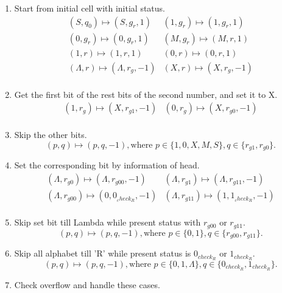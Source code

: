 \documentclass[a4papper]{article}
\theoremstyle{neosn}
\begin{document}
    \begin{enumerate}
        \item Start from initial cell with initial status.
        \[
            \begin{array}{ll}
            (S, q_{0}) \mapsto (S, g_{r}, 1) & (1, g_{r}) \mapsto (1, g_{r}, 1) \\
            (0, g_{r}) \mapsto (0, g_{r}, 1) & (M, g_{r}) \mapsto (M, r, 1) \\
            (1, r) \mapsto (1, r, 1) & (0, r) \mapsto (0, r, 1) \\
            (\Lambda, r) \mapsto (\Lambda, r_{g}, -1) & (X, r) \mapsto (X, r_{g}, -1)\\
            \end{array}
        \]
        \item Get the first bit of the rest bits of the second number, and set it to X.
        \[
            \begin{array}{ll}
            (1, r_{g}) \mapsto (X, r_{g1}, -1) & (0, r_{g}) \mapsto (X, r_{g0}, -1) \\
            \end{array}
        \]
        \item Skip the other bits.
        \[
            (p, q) \mapsto (p, q, -1), \text{where } p \in \{1,0,X,M,S\}, q \in \{r_{g1}, r_{g0}\}.
        \]
        \item Set the corresponding bit by information of head.
        \[
            \begin{array}{ll}
                (\Lambda, r_{g0}) \mapsto (\Lambda, r_{g00}, -1) & (\Lambda, r_{g1}) \mapsto (\Lambda, r_{g11}, -1) \\
                (\Lambda, r_{g00}) \mapsto (0, 0_{_check_R}, -1) & (\Lambda, r_{g11}) \mapsto (1, 1_{_check_R}, -1) \\
            \end{array}
        \]
        \item Skip set bit till Lambda while present status with $r_{g00}$ or $r_{g11}$.
        \[
            (p, q) \mapsto (p, q, -1), \text{where } p \in \{0,1\}, q \in \{r_{g00}, r_{g11}\}.
        \]
        \item Skip all alphabet till 'R' while present status is $0_{check_R}$ or $1_{check_R}$.
        \[
            (p, q) \mapsto (p, q, -1), \text{where } p \in \{0, 1, \Lambda\}, q \in \{0_{check_R}, 1_{check_R}\}.
        \]
        \item Check overflow and handle these cases.
        \[
\]
\end{enumerate}
\end{document}
